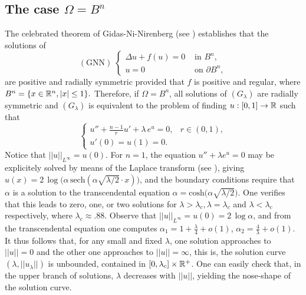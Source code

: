 
\subsection{The case $\Omega=B^n$}
\label{sec:ball}
The celebrated theorem of Gidas-Ni-Nirenberg (see \cite{gidas-ni-nirenberg})
establishes that the solutions of
\begin{equation}
    (\mbox{GNN})\;\left\{ 
        \begin{array}{cc} \Delta u + f(u)=0 & \mbox{ in }B^n,\\
        u=0 & \mbox{ on }\partial B^n,
    \end{array}\right.
\end{equation}
are positive and radially symmetric provided that $f$ is positive and regular,
where $B^n=\{x\in\mathbb{R}^n,|x|\leq 1\}.$ Therefore, if $\Omega=B^n$, all solutions
of $(G_\lambda)$ are radially symmetric and $(G_\lambda)$ is equivalent to the
problem of finding $u:[0,1]\to\mathbb{R}$ such that
\begin{equation}
    \left\{\begin{array}{lc} 
            u''+\frac{n-1}{r}u'+\lambda\, e^u =0, & r\in (0,1),\\
    u'(0) = u(1) = 0.&  \end{array}\right.
\end{equation}
Notice that $||u||_{L^\infty}=u(0)$. For $n=1$, the equation $u''+\lambda e^u=0$
may be explicitely solved by means of the Laplace transform (see \cite{bratu}),
giving $u(x)=2\,\log\big(\alpha\,\mbox{sech}(\alpha\sqrt{\lambda/2}\cdot
x)\big)$, and the boundary conditions require that $\alpha$ is a solution to
the transcendental equation $\alpha
=\mbox{cosh}\big(\alpha\sqrt{\lambda/2}\big)$. One verifies that this leads to
zero, one, or two solutions for $\lambda>\lambda_c,\lambda=\lambda_c$ and
$\lambda<\lambda_c$ respectively, where $\lambda_c\approx .88$. Observe that
$||u||_{L^\infty}=u(0)=2\,\log\alpha$, and from the transcendental equation one
computes $\alpha_1=1+\frac{\lambda}{4}+o(1)$, $\alpha_2=\frac{4}{\lambda}+o(1)$.
It thus follows that, for any small and fixed $\lambda$, one solution
approaches to $||u||=0$ and the other one approaches to $||u||=\infty$, this is,
the solution curve $(\lambda, ||u_\lambda||)$ is unbounded, contained in
$[0,\lambda_c]\times \mathbb{R}^+$. One can easily check that, in the upper branch of
solutions, $\lambda$ decreases with $||u||$, yielding the nose-shape of the
solution curve.

